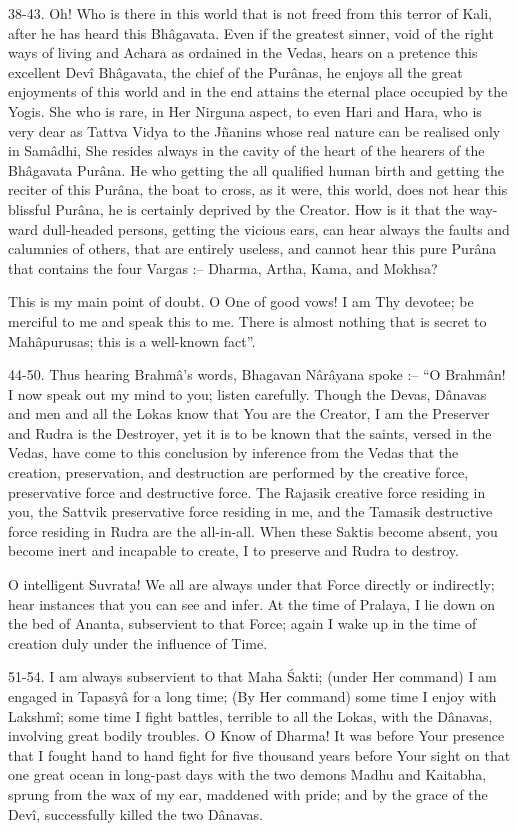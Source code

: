 38-43. Oh! Who is there in this world that is not freed from this terror of Kali, after he has heard this Bh\^agavata. Even if the greatest sinner, void of the right ways of living and Achara as ordained in the Vedas, hears on a pretence this excellent Dev\^i Bh\^agavata, the chief of the Pur\^anas, he enjoys all the great enjoyments of this world and in the end attains the eternal place occupied by the Yogis. She who is rare, in Her Nirguna aspect, to even Hari and Hara, who is very dear as Tattva Vidya to the Jñanins whose real nature can be realised only in Sam\^adhi, She resides always in the cavity of the heart of the hearers of the Bh\^agavata Pur\^ana. He who getting the all qualified human birth and getting the reciter of this Pur\^ana, the boat to cross, as it were, this world, does not hear this blissful Pur\^ana, he is certainly deprived by the Creator. How is it that the way-ward dull-headed persons, getting the vicious ears, can hear always the faults and calumnies of others, that are entirely useless, and cannot hear this pure Pur\^ana that contains the four Vargas :-- Dharma, Artha, Kama, and Mokhsa?

This is my main point of doubt. O One of good vows! I am Thy devotee; be merciful to me and speak this to me. There is almost nothing that is secret to Mah\^apurusas; this is a well-known fact''.

44-50. Thus hearing Brahm\^a's words, Bhagavan N\^ar\^ayana spoke :-- ``O Brahm\^an! I now speak out my mind to you; listen carefully. Though the Devas, D\^anavas and men and all the Lokas know that You are the Creator, I am the Preserver and Rudra is the Destroyer, yet it is to be known that the saints, versed in the Vedas, have come to this conclusion by inference from the Vedas that the creation, preservation, and destruction are performed by the creative force, preservative force and destructive force. The Rajasik creative force residing in you, the  Sattvik preservative force residing in me, and the Tamasik destructive force residing in Rudra are the all-in-all. When these Saktis become absent, you become inert and incapable to create, I to preserve and Rudra to destroy.

O intelligent Suvrata! We all are always under that Force directly or indirectly; hear instances that you can see and infer. At the time of Pralaya, I lie down on the bed of Ananta, subservient to that Force; again I wake up in the time of creation duly under the influence of Time.

51-54. I am always subservient to that Maha \'Sakti; (under Her command) I am engaged in Tapasy\^a for a long time; (By Her command) some time I enjoy with Lakshm\^i; some time I fight battles, terrible to all the Lokas, with the D\^anavas, involving great bodily troubles. O Know of Dharma! It was before Your presence that I fought hand to hand fight for five thousand  years before Your sight on that one great ocean in long-past days with the two demons Madhu and Kaitabha, sprung from the wax of my ear, maddened with pride; and by the grace of the Dev\^i, successfully killed the two D\^anavas.

